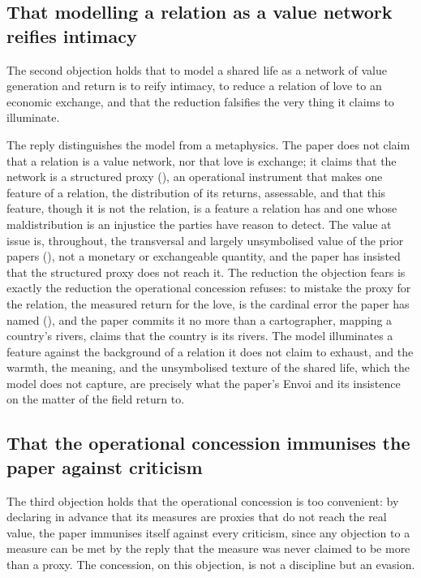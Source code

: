 \subsection{That modelling a relation as a value network reifies intimacy}
\label{p11:sec:obj-reification}

The second objection holds that to model a shared life as a network of value generation and return is to reify intimacy, to reduce a relation of love to an economic exchange, and that the reduction falsifies the very thing it claims to illuminate.

The reply distinguishes the model from a metaphysics. The paper does not claim that a relation is a value network, nor that love is exchange; it claims that the network is a structured proxy (), an operational instrument that makes one feature of a relation, the distribution of its returns, assessable, and that this feature, though it is not the relation, is a feature a relation has and one whose maldistribution is an injustice the parties have reason to detect. The value at issue is, throughout, the transversal and largely unsymbolised value of the prior papers (), not a monetary or exchangeable quantity, and the paper has insisted that the structured proxy does not reach it. The reduction the objection fears is exactly the reduction the operational concession refuses: to mistake the proxy for the relation, the measured return for the love, is the cardinal error the paper has named (), and the paper commits it no more than a cartographer, mapping a country's rivers, claims that the country is its rivers. The model illuminates a feature against the background of a relation it does not claim to exhaust, and the warmth, the meaning, and the unsymbolised texture of the shared life, which the model does not capture, are precisely what the paper's Envoi and its insistence on the matter of the field return to.

\subsection{That the operational concession immunises the paper against criticism}
\label{p11:sec:obj-concession}

The third objection holds that the operational concession is too convenient: by declaring in advance that its measures are proxies that do not reach the real value, the paper immunises itself against every criticism, since any objection to a measure can be met by the reply that the measure was never claimed to be more than a proxy. The concession, on this objection, is not a discipline but an evasion.

